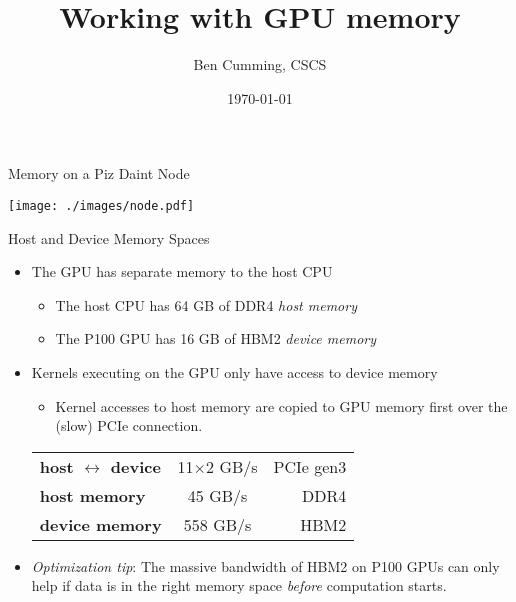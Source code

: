 \documentclass[aspectratio=43]{beamer}
\author{Ben Cumming, CSCS}
\title{Working with GPU memory}
\subtitle{}
\date{\today}
\begin{document}
\cscstitle

\begin{frame}[fragile]{Memory on a Piz Daint Node}
    \begin{center}
        \texttt{[image: ./images/node.pdf]}
    \end{center}
\end{frame}

\begin{frame}[fragile]{Host and Device Memory Spaces}
    \begin{itemize}
        \item The GPU has separate memory to the host CPU
            \begin{itemize}
                \item The host CPU has 64 GB of DDR4 \emph{host memory}
                \item The P100 GPU has 16 GB of HBM2 \emph{device memory}
            \end{itemize}
        \item Kernels executing on the GPU only have access to device memory
            \begin{itemize}
                \item Kernel accesses to host memory are copied to GPU memory first over the (slow) PCIe connection.
            \end{itemize}

            \begin{center}
                \begin{tabular}{lcr}
                    \textbf{host $\leftrightarrow$ device} & 11$\times$2 GB/s & PCIe gen3 \\
                    \textbf{host memory}                   & 45 GB/s  & DDR4      \\
                    \textbf{device memory}                 & 558 GB/s & HBM2
                \end{tabular}
            \end{center}

        \item \emph{Optimization tip}: The massive bandwidth of HBM2 on P100 GPUs can only help if data is in the right memory space \emph{before} computation starts.
    \end{itemize}

\end{frame}
\end{document}
